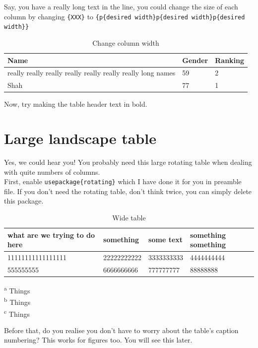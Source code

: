 Say, you have a really long text in the line, you could change the size of each column by changing
\verb+{XXX}+ to \verb+{p{desired width}p{desired width}p{desired width}}+

\begin{table}[h!]
\caption{Change column width}
\begin{tabularx}{1\linewidth}{p{10.0cm}XX}    \addlinespace
    \toprule
    Name & Gender & Ranking \\
    \toprule
    really really really really really really really long names & 59 & 2 \\
    Shah & 77 & 1 \\
    \bottomrule
    \end{tabularx}
\end{table}

Now, try making the table header text in bold.

\section{Large landscape table}
Yes, we could hear you! You probably need this large rotating table when dealing with quite numbers of columns.\\

First, enable \verb+usepackage{rotating}+ which I have done it for you in preamble file. If you don't need the rotating table, don't think twice, you can simply delete this package.\\

\begin{table}
    \centering
\caption{Wide table}
\begin{tabularx}{\textwidth}{XXXX}
    \toprule
what are we trying to do here & something  & some text & something something  \\
    \toprule
11111111111111111 & 22222222222  & 3333333333 & 4444444444  \\
555555555 & 6666666666  & 777777777 & 88888888  \\
\bottomrule
\end{tabularx}
\begin{flushleft}
\textsuperscript{a} Things \\
\textsuperscript{b} Things \\
\textsuperscript{c} Things \\
\end{flushleft}
\end{table}

Before that, do you realise you don't have to worry about the table's caption numbering? This works
for figures too. You will see this later.

